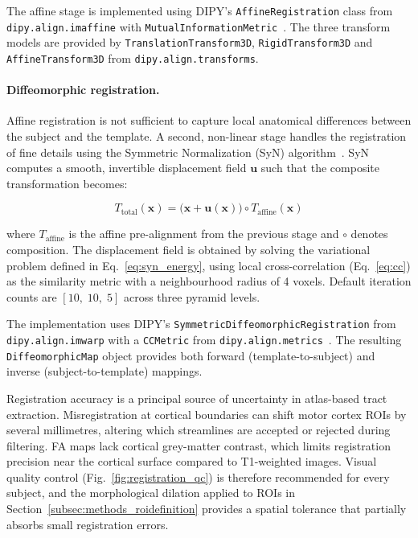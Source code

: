 The affine stage is implemented using DIPY's \texttt{AffineRegistration} class from \texttt{dipy.align.\-imaffine} with \texttt{MutualInformationMetric}~\cite{garyfallidis_dipy_2014}. The three transform models are provided by \texttt{TranslationTransform3D}, \texttt{RigidTransform3D} and \texttt{AffineTransform3D} from \texttt{dipy.align.\-transforms}.


\paragraph{Diffeomorphic registration.}

Affine registration is not sufficient to capture local anatomical differences between the subject and the template. A second, non-linear stage handles the registration of fine details using the Symmetric Normalization (SyN) algorithm~\cite{avants_symmetric_2008}. SyN computes a smooth, invertible displacement field $\mathbf{u}$ such that the composite transformation becomes:

\begin{equation}
	T_{\text{total}}(\mathbf{x}) = \bigl(\mathbf{x} + \mathbf{u}(\mathbf{x})\bigr) \circ T_{\text{affine}}(\mathbf{x})
	\label{eq:composite_registration}
\end{equation}

where $T_{\text{affine}}$ is the affine pre-alignment from the previous stage and $\circ$ denotes composition. The displacement field is obtained by solving the variational problem defined in Eq.~\ref{eq:syn_energy}, using local cross-correlation (Eq.~\ref{eq:cc}) as the similarity metric with a neighbourhood radius of 4 voxels. Default iteration counts are $[10,\; 10,\; 5]$ across three pyramid levels.

The implementation uses DIPY's \texttt{SymmetricDiffeomorphicRegistration} from \texttt{dipy.align.imwarp} with a \texttt{CCMetric} from \texttt{dipy.align.metrics}~\cite{garyfallidis_dipy_2014}. The resulting \texttt{DiffeomorphicMap} object provides both forward (template-to-subject) and inverse (subject-to-template) mappings.

Registration accuracy is a principal source of uncertainty in atlas-based tract extraction. Misregistration at cortical boundaries can shift motor cortex ROIs by several millimetres, altering which streamlines are accepted or rejected during filtering. FA maps lack cortical grey-matter contrast, which limits registration precision near the cortical surface compared to T1-weighted images. Visual quality control (Fig.~\ref{fig:registration_qc}) is therefore recommended for every subject, and the morphological dilation applied to ROIs in Section~\ref{subsec:methods_roidefinition} provides a spatial tolerance that partially absorbs small registration errors.

